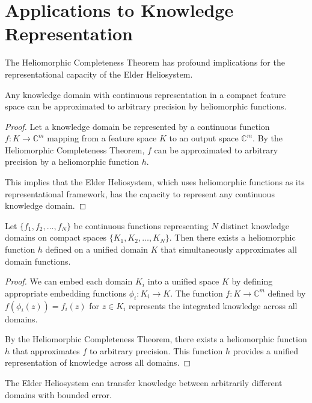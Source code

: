 \section{Applications to Knowledge Representation}

The Heliomorphic Completeness Theorem has profound implications for the representational capacity of the Elder Heliosystem.

\begin{corollary}
Any knowledge domain with continuous representation in a compact feature space can be approximated to arbitrary precision by heliomorphic functions.
\end{corollary}

\begin{proof}
Let a knowledge domain be represented by a continuous function $f: K \rightarrow \mathbb{C}^m$ mapping from a feature space $K$ to an output space $\mathbb{C}^m$. By the Heliomorphic Completeness Theorem, $f$ can be approximated to arbitrary precision by a heliomorphic function $h$.

This implies that the Elder Heliosystem, which uses heliomorphic functions as its representational framework, has the capacity to represent any continuous knowledge domain.
\end{proof}

\begin{theorem}
Let $\{f_1, f_2, \ldots, f_N\}$ be continuous functions representing $N$ distinct knowledge domains on compact spaces $\{K_1, K_2, \ldots, K_N\}$. Then there exists a heliomorphic function $h$ defined on a unified domain $K$ that simultaneously approximates all domain functions.
\end{theorem}

\begin{proof}
We can embed each domain $K_i$ into a unified space $K$ by defining appropriate embedding functions $\phi_i: K_i \rightarrow K$. The function $f: K \rightarrow \mathbb{C}^m$ defined by $f(\phi_i(z)) = f_i(z)$ for $z \in K_i$ represents the integrated knowledge across all domains.

By the Heliomorphic Completeness Theorem, there exists a heliomorphic function $h$ that approximates $f$ to arbitrary precision. This function $h$ provides a unified representation of knowledge across all domains.
\end{proof}

\begin{corollary}
The Elder Heliosystem can transfer knowledge between arbitrarily different domains with bounded error.
\end{corollary}

